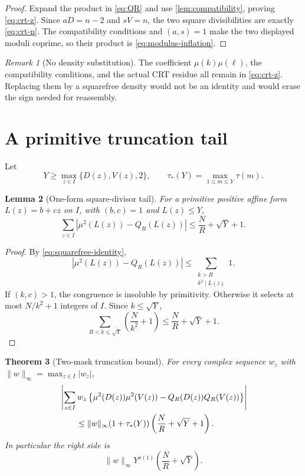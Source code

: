 \documentclass[11pt]{article}
\newtheorem{theorem}{Theorem}[section]
\newtheorem{lemma}[theorem]{Lemma}
\theoremstyle{definition}
\theoremstyle{remark}
\newtheorem{remark}[theorem]{Remark}
\begin{document}
\begin{proof}
Expand the product in \eqref{eq:QR} and use
\cref{lem:compatibility}, proving \eqref{eq:crt-z}.  Since
\(aD=n-2\) and \(sV=n\), the two square divisibilities are exactly
\eqref{eq:crt-n}.  The compatibility conditions and
\((a,s)=1\) make the two displayed moduli coprime, so their product
is \eqref{eq:modulus-inflation}.
\end{proof}

\begin{remark}[No density substitution]
The coefficient \(\mu(k)\mu(\ell)\), the compatibility conditions,
and the actual CRT residue all remain in
\eqref{eq:crt-z}.  Replacing them by a squarefree density would not
be an identity and would erase the sign needed for reassembly.
\end{remark}

\section{A primitive truncation tail}

Let
\[
 Y\ge
 \max_{z\in I}\{D(z),V(z),2\},\qquad
 \tau_*(Y)=\max_{1\le m\le Y}\tau(m).
\]

\begin{lemma}[One-form square-divisor tail]
\label{lem:one-tail}
For a primitive positive affine form \(L(z)=b+cz\) on \(I\), with
\((b,c)=1\) and \(L(z)\le Y\),
\begin{equation}
 \sum_{z\in I}
 \left|\mu^2(L(z))-Q_R(L(z))\right|
 \le
 \frac NR+\sqrt Y+1.
\label{eq:one-tail}
\end{equation}
\end{lemma}

\begin{proof}
By \eqref{eq:squarefree-identity},
\[
 |\mu^2(L(z))-Q_R(L(z))|
 \le
 \sum_{\substack{k>R\\k^2\mid L(z)}}1.
\]
If \((k,c)>1\), the congruence is insoluble by primitivity.  Otherwise
it selects at most \(N/k^2+1\) integers of \(I\).  Since
\(k\le\sqrt Y\),
\[
 \sum_{R<k\le\sqrt Y}\left(\frac N{k^2}+1\right)
 \le \frac NR+\sqrt Y+1.
\]
\end{proof}

\begin{theorem}[Two-mask truncation bound]
\label{thm:tail}
For every complex sequence \(w_z\) with
\(\|w\|_\infty=\max_{z\in I}|w_z|\),
\begin{align}
 &\left|
 \sum_{z\in I}w_z
 \left\{
 \mu^2(D(z))\mu^2(V(z))
 -
 Q_R(D(z))Q_R(V(z))
 \right\}
 \right|
\notag\\
 &\qquad\le
 \|w\|_\infty(1+\tau_*(Y))
 \left(\frac NR+\sqrt Y+1\right).
\label{eq:two-tail}
\end{align}
In particular the right side is
\[
 \|w\|_\infty
 Y^{o(1)}\left(\frac NR+\sqrt Y\right).
\]
\end{theorem}
\end{document}
